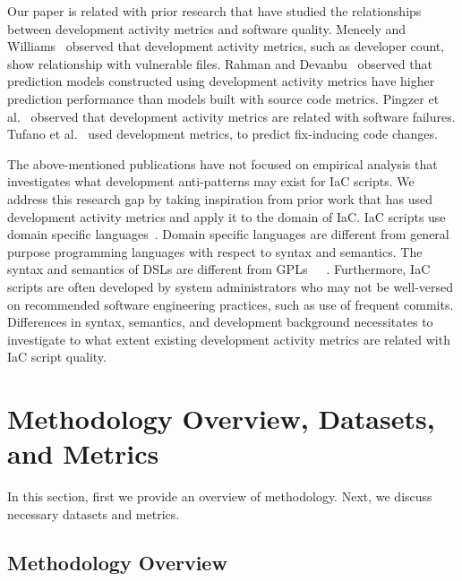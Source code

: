 \documentclass[smallextended]{svjour3}       %
\begin{document}
Our paper is related with prior research that have studied the relationships between development activity metrics and software quality. Meneely and Williams~\citep{Meneely:Linus} observed that development activity metrics, such as developer count, show relationship with vulnerable files. Rahman and Devanbu~\citep{Rahman:2013:ProcessBetter} observed that prediction models constructed using development activity metrics have higher prediction performance than models built with source code metrics. Pingzer et al.~\citep{Pinzger:Failure} observed that development activity metrics are related with software failures. Tufano et al.~\citep{penta:fix:commit} used development metrics, to predict fix-inducing code changes. 

The above-mentioned publications have not focused on empirical analysis that investigates what development anti-patterns may exist for IaC scripts. We address this research gap by taking inspiration from prior work that has used development activity metrics and apply it to the domain of IaC. IaC scripts use domain specific languages~\citep{ShambaughRehearsal2016}. Domain specific languages are different from general purpose programming languages with respect to syntax and semantics. The syntax and semantics of DSLs are different from GPLs~\citep{DSL:ENGG}~\citep{DSL:DIFF:HUDAK1998}~\citep{DSL:DIFF:VANWYK2007}. Furthermore, IaC scripts are often developed by system administrators who may not be well-versed on recommended software engineering practices, such as use of frequent commits. Differences in syntax, semantics, and development background necessitates to investigate to what extent existing development activity metrics are related with IaC script quality.  



\section{Methodology Overview, Datasets, and Metrics}
\label{dataset}

In this section, first we provide an overview of methodology. Next, we discuss necessary datasets and metrics. 

\subsection{Methodology Overview}
\label{overview}
\end{document}
